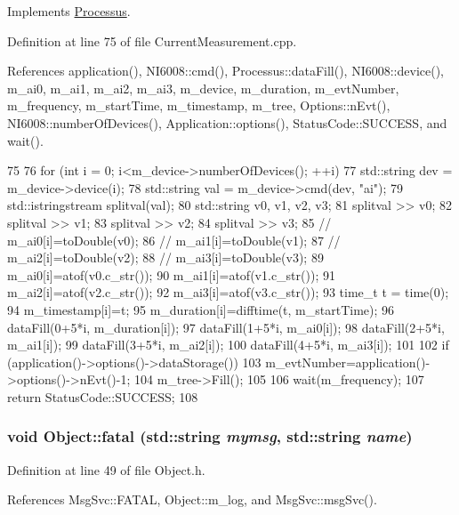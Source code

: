 Implements \hyperlink{classProcessus_a63767a63a1fb0055c5aa45b21a4a5d58}{Processus}.

Definition at line 75 of file CurrentMeasurement.cpp.

References application(), NI6008::cmd(), Processus::dataFill(), NI6008::device(), m\_\-ai0, m\_\-ai1, m\_\-ai2, m\_\-ai3, m\_\-device, m\_\-duration, m\_\-evtNumber, m\_\-frequency, m\_\-startTime, m\_\-timestamp, m\_\-tree, Options::nEvt(), NI6008::numberOfDevices(), Application::options(), StatusCode::SUCCESS, and wait().


\begin{DoxyCode}
75                                          {
76   for (int i = 0; i<m_device->numberOfDevices(); ++i){
77     std::string dev = m_device->device(i);
78     std::string val = m_device->cmd(dev, "ai");
79     std::istringstream splitval(val);
80     std::string v0, v1, v2, v3;
81     splitval >> v0;
82     splitval >> v1;
83     splitval >> v2;
84     splitval >> v3;
85     // m_ai0[i]=toDouble(v0);
86     // m_ai1[i]=toDouble(v1);
87     // m_ai2[i]=toDouble(v2);
88     // m_ai3[i]=toDouble(v3);
89     m_ai0[i]=atof(v0.c_str());
90     m_ai1[i]=atof(v1.c_str());
91     m_ai2[i]=atof(v2.c_str());
92     m_ai3[i]=atof(v3.c_str());
93     time_t t = time(0);
94     m_timestamp[i]=t;
95     m_duration[i]=difftime(t, m_startTime);
96     dataFill(0+5*i, m_duration[i]);
97     dataFill(1+5*i, m_ai0[i]);
98     dataFill(2+5*i, m_ai1[i]);
99     dataFill(3+5*i, m_ai2[i]);
100     dataFill(4+5*i, m_ai3[i]);
101   }
102   if (application()->options()->dataStorage()){
103     m_evtNumber=application()->options()->nEvt()-1;
104     m_tree->Fill();
105   }
106   wait(m_frequency);
107   return StatusCode::SUCCESS;
108 }
\end{DoxyCode}
\hypertarget{classObject_ae62acd3d09f716220f75f252dc38bc9a}{
\subsubsection[{fatal}]{\setlength{\rightskip}{0pt plus 5cm}void Object::fatal (std::string {\em mymsg}, \/  std::string {\em name})}}
\label{classObject_ae62acd3d09f716220f75f252dc38bc9a}


Definition at line 49 of file Object.h.

References MsgSvc::FATAL, Object::m\_\-log, and MsgSvc::msgSvc().


